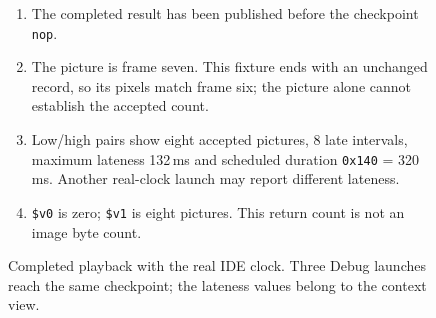 \begin{figure}[htbp]
  \par\smallskip
  \begin{minipage}{\linewidth}
    \small
    \begin{enumerate}
      \item The completed result has been published before the checkpoint \texttt{nop}.
      \item The picture is frame seven. This fixture ends with an unchanged record, so its pixels match frame six; the picture alone cannot establish the accepted count.
      \item Low/high pairs show eight accepted pictures, 8 late intervals, maximum lateness 132\,ms and scheduled duration \texttt{0x140} = 320\,ms. Another real-clock launch may report different lateness.
      \item \texttt{\$v0} is zero; \texttt{\$v1} is eight pictures. This return count is not an image byte count.
    \end{enumerate}
  \end{minipage}
  \caption{Completed playback with the real IDE clock. Three Debug launches reach the same checkpoint; the lateness values belong to the context view.}
  \label{fig:video-playback-progress}
\end{figure}
